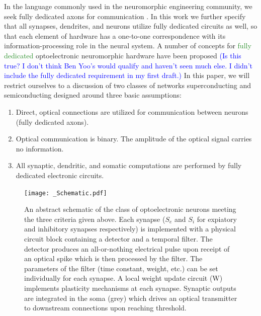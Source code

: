 \documentclass[twocolumn]{article}
\begin{document}
In the language commonly used in the neuromorphic engineering community, we seek fully dedicated axons for communication \cite{seda2016}. In this work we further specify that all synapses, dendrites, and neurons utilize fully dedicated circuits as well, so that each element of hardware has a one-to-one correspondence with its information-processing role in the neural system. A number of concepts for \textcolor{ForestGreen}{fully dedicated} optoelectronic neuromorphic hardware have been proposed \textcolor{blue}{(Is this true? I don't think Ben Yoo's would qualify and haven't seen much else. I didn't include the fully dedicated requirement in my first draft.)} In this paper, we will restrict ourselves to a discussion of two classes of networks \textemdash superconducting and semiconducting \textemdash designed around three basic assumptions:


\begin{enumerate}
    \item Direct, optical connections are utilized for communication between neurons (fully dedicated axons).
    \item Optical communication is binary. The amplitude of the optical signal carries no information.
    \item All synaptic, dendritic, and somatic computations are performed by fully dedicated electronic circuits.
\end{enumerate}

\begin{figure}
    \centering
    \texttt{[image: \_Schematic.pdf]}
    \caption{An abstract schematic of the class of optoelectronic neurons meeting the three criteria given above. Each synapse ($S_e$ and $S_i$ for expiatory and inhibitory synapses respectively) is implemented with a physical circuit block containing a detector and a temporal filter. The detector produces an all-or-nothing electrical pulse upon receipt of an optical spike which is then processed by the filter. The parameters of the filter (time constant, weight, etc.) can be set individually for each synapse. A local weight update circuit (W) implements plasticity mechanisms at each synapse. Synaptic outputs are integrated in the soma (grey) which drives an optical transmitter to downstream connections upon reaching threshold.}
    \label{fig:Schematic}
\end{figure}
\end{document}
